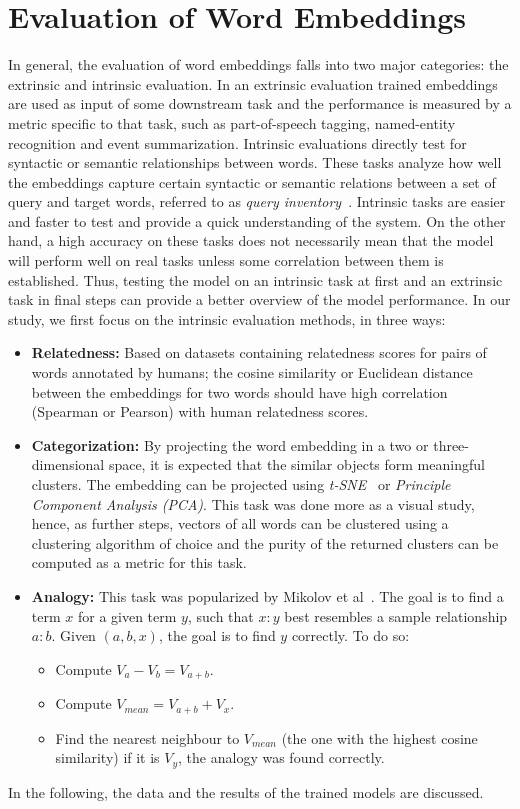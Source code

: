 \section{Evaluation of Word Embeddings}\label{sec:eval_embeddings}
In general, the evaluation of word embeddings falls into two major categories: the extrinsic and intrinsic evaluation. In an extrinsic evaluation trained embeddings are used as input of some downstream task and the performance is measured by a metric specific to that task, such as part-of-speech tagging, named-entity recognition and event summarization. Intrinsic evaluations directly test for syntactic or semantic relationships between words. These tasks analyze how well the embeddings capture certain syntactic or semantic relations between a set of query and target words, referred to as \textit{query inventory}~\cite{Schnabel2015EvaluationMF}. Intrinsic tasks are easier and faster to test and provide a quick understanding of the system. On the other hand, a high accuracy on these tasks does not necessarily mean that the model will perform well on real tasks unless some correlation between them is established. Thus, testing the model on an intrinsic task at first and an extrinsic task in final steps can provide a better overview of the model performance. In our study, we first focus on the intrinsic evaluation methods, in three ways: 
 \begin{itemize}
 \item \textbf{Relatedness:} Based on datasets containing relatedness scores for pairs of words annotated by humans; the cosine similarity or Euclidean distance between the embeddings for two words should have high correlation (Spearman or Pearson) with human relatedness scores.
  \item \textbf{Categorization:} By projecting the word embedding in a two or three-dimensional space, it is expected that the similar objects form meaningful clusters. The embedding can be projected using \emph{t-SNE}~\cite{vanDerMaaten2008} or \emph{Principle Component Analysis (PCA)}. This task was done more as a visual study, hence, as further steps, vectors of all words can be clustered using a clustering algorithm of choice and the purity of the returned clusters can be computed as a metric for this task. 

 \item \textbf{Analogy:} This task was popularized by Mikolov et al~\cite{DBLP:journals/corr/abs-1301-3781}. The goal is to find a term $x$ for a given term $y$, such that  $x : y$ best resembles a sample relationship $a : b$. Given $(a,b,x)$, the goal is to find $y$ correctly. To do so: 
\begin{itemize}
    \item Compute $V_a-V_b=V_{a+b}$.
    \item  Compute $V_{mean}=V_{a+b}+V_x$.
    \item  Find the nearest neighbour to $V_{mean}$ (the one with the highest cosine similarity) if it is $V_y$, the analogy was found correctly.
  \end{itemize}
   \end{itemize}
In the following, the data and the results of the trained models are discussed. 
